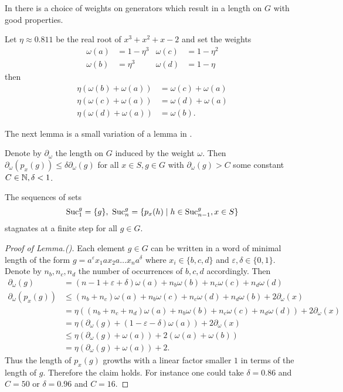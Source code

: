 \documentclass[a4paper,12pt]{article}
\begin{document}
In \cite{Bartholdi:Growth} there is a choice of weights on generators which result in a length on $G$ with good properties.
\begin{lem} \label{lem:laurentsweights}
 Let $\eta\approx 0.811$ be the real root of $x^3+x^2+x-2$ and set the weights 
 \begin{align*}
  \omega(a) &= 1-\eta^3 & \omega(c)&=1-\eta^2 \\ \omega(b)&= \eta^3 & \omega(d)&=1-\eta
 \end{align*}
 then 
 \begin{align*}
  \eta(\omega(b)+\omega(a)) &= \omega(c)+\omega(a) \\
  \eta(\omega(c)+\omega(a)) &= \omega(d)+\omega(a) \\
  \eta(\omega(d)+\omega(a)) &= \omega(b).
 \end{align*}
\end{lem}
The next lemma is a small variation of a lemma in \cite{Bartholdi:Growth}.
\begin{lem}
 Denote by $\partial_\omega$ the length on $G$ induced by the weight $\omega$. Then
 $\partial_\omega(p_x(g)) \leq \delta \partial_\omega(g)$ for all $x\in S, g\in G$ with $\partial_\omega(g)>C$ some constant $C\in\mathbb{N},\delta<1$.
\end{lem}
\begin{cor}
The sequences of sets
 \[\textup{Suc}_1^g=\{g\},\ \textup{Suc}_n^g = \{p_x(h) \mid h\in \textup{Suc}_{n-1}^g, x\in S\} \]
 stagnates at a finite step for all $g\in G$.
\end{cor}
\begin{proof}[Proof of Lemma.(\cite{Bartholdi:Growth})] 
 Each element $g\in G$ can be written in a word of minimal length of the form $g=a^\varepsilon x_1 a x_2 a\ldots x_n a^\delta$ where
 $x_i\in \{b,c,d\}$ and $\varepsilon,\delta\in \{0,1\}$. Denote by $n_b,n_c,n_d$ the number of occurrences of $b,c,d$ accordingly. 
 Then
 \begin{align*}
  \partial_\omega(g) &= (n-1+\varepsilon+\delta)\omega(a)+n_b\omega(b)+n_c\omega(c)+n_d\omega(d)\\
  \partial_\omega(p_x(g)) &\leq (n_b+n_c)\omega(a)+n_b\omega(c)+n_c\omega(d)+n_d\omega(b) + 2\partial_\omega(x)\\
  &= \eta\left( (n_b+n_c+n_d)\omega(a)+n_b\omega(b)+n_c\omega(c)+n_d\omega(d) \right) + 2\partial_\omega(x)\\
  &= \eta(\partial_\omega(g) +(1-\varepsilon-\delta)\omega(a)) + 2\partial_\omega(x) \\
  &\leq \eta(\partial_\omega(g)+\omega(a)) + 2(\omega(a)+\omega(b))\\
  &= \eta(\partial_\omega(g)+\omega(a)) + 2.
 \end{align*}
 Thus the length of $p_x(g)$ growths with a linear factor smaller $1$ in terms of the length of $g$. Therefore the claim holds.
 For instance one could take $\delta =0.86$ and $C=50$ or $\delta=0.96$ and $C=16$.
\end{proof}
\end{document}
